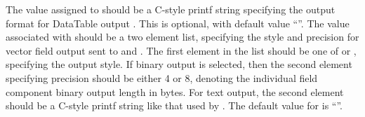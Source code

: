 \begin{description}
The value assigned to
 should be a C-style printf string specifying
the output format for DataTable output .  This is
optional, with default value ``''.  The value associated with
 should be a two element list,
specifying the style and precision for vector field output sent to
 and
.  The first
element in the list should be one of  or , specifying
the output style.  If binary output is selected, then the second element
specifying precision should be either 4 or 8, denoting the individual
field component binary output length in bytes.  For text output, the
second element should be a C-style printf string like that used by
.  The default value for
 is ``''.


\end{description}
